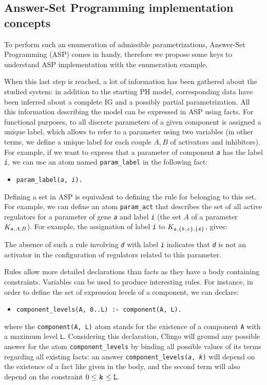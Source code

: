 \subsection{Answer-Set Programming implementation concepts}

\newcommand{\ti}[1]{\texttt{\textit{#1}}}
\newcommand{\aspil}[1]{\texttt{#1}}
\newcommand{\asp}[1]{\begin{itemize} \item[] \aspil{#1} \end{itemize}}

To perform such an enumeration of admissible parametrizations, Answer-Set Programming (ASP) \cite{Baral03} comes in handy, therefore we propose some keys to understand ASP implementation with the enumeration example.

When this last step is reached, a lot of information has been gathered about the studied system: in addition to the starting PH model, corresponding data have been inferred about a complete IG and a possibly partial parametrization.
All this information describing the model can be expressed in ASP using facts.
For functional purposes, to all discrete parameters of a given component is assigned a unique label, which allows to refer to a parameter using two variables (in other terms, we define a unique label for each couple $A,B$ of activators and inhibitors).
For example, if we want to express that a parameter of component \ti{a} has the label \ti{i}, we can use an atom named \aspil{param\_label} in the following fact:
\asp{param\_label(\ti{a}, \ti{i}).}

Defining a set in ASP is equivalent to defining the rule for belonging to this set. For example, we can define an atom \aspil{param\_act} that describes the set of all active regulators for a parameter of gene \ti{a} and label \ti{i} (\ie the set $A$ of a parameter $K_{\ti{a},A,B}$). For example, the assignation of label \ti{i} to $K_{\ti{a},\{\ti{b},\ti{c}\},\{\ti{d}\}}$, gives:
\asp{param\_act(\ti{a}, \ti{i}, \ti{b}). \item[] param\_act(\ti{a}, \ti{i}, \ti{c}).}
The absence of such a rule involving \ti{d} with label \ti{i} indicates that \ti{d} is not an activator in the configuration of regulators related to this parameter.

Rules allow more detailed declarations than facts as they have a body containing constraints. Variables can be used to produce interesting rules.
For instance, in order to define the set of expression levels of a component, we can declare:
\asp{component\_levels(A, 0..L) :- component(A, L).}
where the \aspil{component(A, L)} atom stands for the existence of a component \aspil{A} with a maximum level \aspil{L}.
Considering this declaration, Clingo will ground any possible answer for the atom \aspil{component\_levels} by binding all possible values of its terms regarding all existing facts: an answer \aspil{component\_levels(\ti{a}, \ti{k})} will depend on the existence of a fact like given in the body, and the second term will also depend on the constraint $0 \leq \ti{k} \leq \aspil{L}$.

